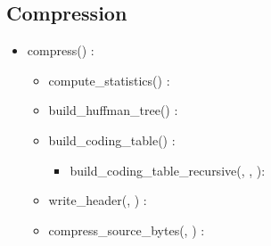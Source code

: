 \subsection{Compression}


\begin{itemize}
    \item compress(\binaryFile) : \binaryFile
    \begin{itemize}
        \item compute\_statistics(\binaryFile) : \statistics
        \item build\_huffman\_tree(\statistics) : \huffmanTree
        \item build\_coding\_table(\huffmanTree) : \codingTable
        \begin{itemize}
            \item build\_coding\_table\_recursive(\huffmanTree, \codingTable, \binaryCode): \codingTable
        \end{itemize}
        \item write\_header(\binaryFile, \codingTable) : \binaryFile
        \item compress\_source\_bytes(\binaryFile, \codingTable) : \binaryFile
    \end{itemize}
\end{itemize}
